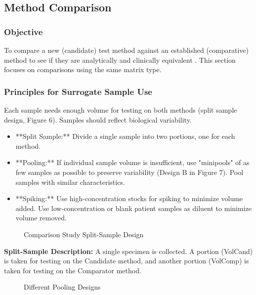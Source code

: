 \documentclass{article}
\begin{document}
\subsection{Method Comparison}

\subsubsection{Objective}
To compare a new (candidate) test method against an established (comparative) method to see if they are analytically and clinically equivalent \cite{CLSIEP09}. This section focuses on comparisons using the same matrix type.

\subsubsection{Principles for Surrogate Sample Use}
Each sample needs enough volume for testing on both methods (split sample design, Figure 6). Samples should reflect biological variability.
\begin{itemize}
    \item **Split Sample:** Divide a single sample into two portions, one for each method.
    \item **Pooling:** If individual sample volume is insufficient, use "minipools" of as few samples as possible to preserve variability (Design B in Figure 7). Pool samples with similar characteristics.
    \item **Spiking:** Use high-concentration stocks for spiking to minimize volume added. Use low-concentration or blank patient samples as diluent to minimize volume removed.
\end{itemize}

\begin{figure}[h!]
    \centering
    \caption{Comparison Study Split-Sample Design \cite{CLSIEP39Ed1E}}
\end{figure}

\textbf{Split-Sample Description:} A single specimen is collected. A portion (VolCand) is taken for testing on the Candidate method, and another portion (VolComp) is taken for testing on the Comparator method.

\begin{figure}[h!]
    \centering
    \caption{Different Pooling Designs \cite{CLSIEP39Ed1E}}
\end{figure}
\end{document}
